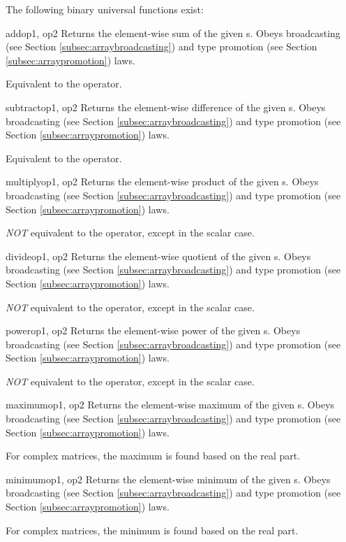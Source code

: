 The following binary universal functions exist:

\begin{funcdesc}{add}{op1, op2}
  Returns the element-wise sum of the given s. Obeys
  broadcasting (see Section \ref{subsec:arraybroadcasting}) and type
  promotion (see Section \ref{subsec:arraypromotion}) laws.

  Equivalent to the \code{+} operator.
\end{funcdesc}
\begin{funcdesc}{subtract}{op1, op2}
  Returns the element-wise difference of the given s. Obeys
  broadcasting (see Section \ref{subsec:arraybroadcasting}) and type
  promotion (see Section \ref{subsec:arraypromotion}) laws.

  Equivalent to the \code{-} operator.
\end{funcdesc}
\begin{funcdesc}{multiply}{op1, op2}
  Returns the element-wise product of the given s. Obeys
  broadcasting (see Section \ref{subsec:arraybroadcasting}) and type
  promotion (see Section \ref{subsec:arraypromotion}) laws.

  \emph{NOT} equivalent to the \code{*} operator, except in the scalar
  case.
\end{funcdesc}
\begin{funcdesc}{divide}{op1, op2}
  Returns the element-wise quotient of the given s. Obeys
  broadcasting (see Section \ref{subsec:arraybroadcasting}) and type
  promotion (see Section \ref{subsec:arraypromotion}) laws.

  \emph{NOT} equivalent to the \code{/} operator, except in the scalar
  case.
\end{funcdesc}
\begin{funcdesc}{power}{op1, op2}
  Returns the element-wise power  of the given
  s. Obeys broadcasting (see Section
  \ref{subsec:arraybroadcasting}) and type promotion (see Section
  \ref{subsec:arraypromotion}) laws.

  \emph{NOT} equivalent to the \code{**} operator, except in the scalar
  case.
\end{funcdesc}
\begin{funcdesc}{maximum}{op1, op2}
  Returns the element-wise maximum of the given
  s. Obeys broadcasting (see Section
  \ref{subsec:arraybroadcasting}) and type promotion (see Section
  \ref{subsec:arraypromotion}) laws.

  For complex matrices, the maximum is found based on the real part.
\end{funcdesc}
\begin{funcdesc}{minimum}{op1, op2}
  Returns the element-wise minimum of the given
  s. Obeys broadcasting (see Section
  \ref{subsec:arraybroadcasting}) and type promotion (see Section
  \ref{subsec:arraypromotion}) laws.

  For complex matrices, the minimum is found based on the real part.
\end{funcdesc}

